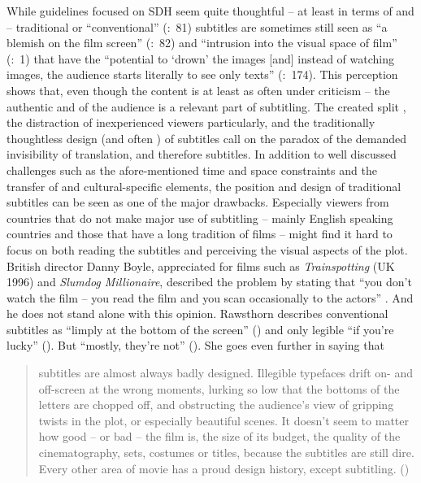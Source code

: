 While guidelines focused on SDH seem quite thoughtful – at least in terms of  and  – traditional or “conventional” (\citealt{Foerster2010}:~81) subtitles are sometimes still seen as “a blemish on the film screen” (\citealt{Diaz_cintas2007}:~82) and “intrusion into the visual space of film” (\citealt{thompson2000}:~1) that have the “potential to ‘drown’ the images [and] instead of watching images, the audience starts literally to see only texts” (\citealt{sinha2004}:~174). This perception shows that, even though the content is at least as often under criticism – the authentic and  of the audience is a relevant part of subtitling. The created split , the distraction of inexperienced viewers particularly, and the traditionally thoughtless design (and often ) of subtitles call on the paradox of the demanded invisibility of translation, and therefore subtitles. In addition to well discussed challenges such as the afore-mentioned time and space constraints and the transfer of  and cultural-specific elements, the position and design of traditional subtitles can be seen as one of the major drawbacks. Especially viewers from countries that do not make major use of subtitling – mainly English speaking countries and those that have a long tradition of  films – might find it hard to focus on both reading the subtitles and perceiving the visual aspects of the plot. British director Danny Boyle, appreciated for films such as \textit{Trainspotting} (UK 1996) and \textit{Slumdog Millionaire}, described the problem by stating that “you don’t watch the film – you read the film and you scan occasionally to the actors” \citep{Beckman2008}. And he does not stand alone with this opinion. Rawsthorn describes conventional subtitles as “limply at the bottom of the screen” (\citeyear{rawsthorn2007}) and only legible “if you’re lucky” (\citealt{rawsthorn2007}). But “mostly, they’re not” (\citealt{rawsthorn2007}). She goes even further in saying that
\begin{quote}
subtitles are almost always badly designed. Illegible typefaces drift on- and off-screen at the wrong moments, lurking so low that the bottoms of the letters are chopped off, and obstructing the audience's view of gripping twists in the plot, or especially beautiful scenes. It doesn't seem to matter how good – or bad – the film is, the size of its budget, the quality of the cinematography, sets, costumes or titles, because the subtitles are still dire. Every other area of movie  has a proud design history, except subtitling. (\citealt{rawsthorn2007})
\end{quote}
